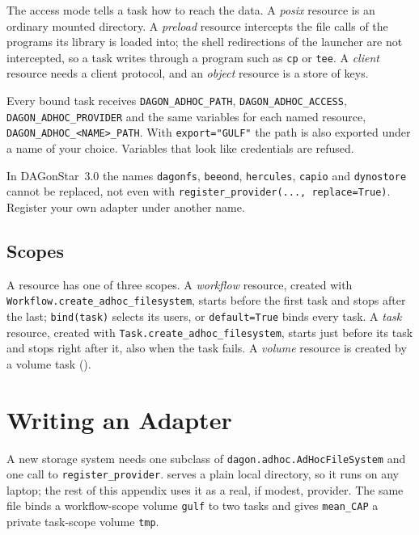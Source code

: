 The access mode tells a task how to reach the data. A \emph{posix} resource is
an ordinary mounted directory. A \emph{preload} resource intercepts the file
calls of the programs its library is loaded into; the shell redirections of the
launcher are not intercepted, so a task writes through a program such as
\texttt{cp} or \texttt{tee}. A \emph{client} resource needs a client protocol,
and an \emph{object} resource is a store of keys.

\begin{sloppypar}
Every bound task receives
\texttt{DAGON\_ADHOC\_PATH}, \texttt{DAGON\_ADHOC\_ACCESS},
\texttt{DAGON\_ADHOC\_PROVIDER} and the same variables for each named resource,
\texttt{DAGON\_ADHOC\_<NAME>\_PATH}. With \texttt{export="GULF"} the path is also
exported under a name of your choice. Variables that look like credentials are
refused.
\end{sloppypar}

\begin{cautionbox}
In DAGonStar~3.0 the names \texttt{dagonfs}, \texttt{beeond},
\texttt{hercules}, \texttt{capio} and \texttt{dynostore} cannot be replaced,
not even with \texttt{register\_provider(..., replace=True)}. Register your own
adapter under another name.
\end{cautionbox}

\subsection{Scopes}

\begin{sloppypar}
A resource has one of three scopes. A \emph{workflow} resource, created with
\texttt{Workflow.create\_adhoc\_filesystem}, starts before the first task and
stops after the last; \texttt{bind(task)} selects its users, or
\texttt{default=True} binds every task. A \emph{task} resource, created with
\texttt{Task.create\_adhoc\_filesystem}, starts just before its task and stops
right after it, also when the task fails. A \emph{volume} resource is created by
a volume task ().
\end{sloppypar}

\section{Writing an Adapter}

A new storage system needs one subclass of
\texttt{dagon.adhoc.AdHocFileSystem} and one call to
\texttt{register\_provider}.  serves a plain local
directory, so it runs on any laptop; the rest of this appendix uses it as a
real, if modest, provider. The same file binds a workflow-scope volume
\texttt{gulf} to two tasks and gives \texttt{mean\_CAP} a private task-scope
volume \texttt{tmp}.


